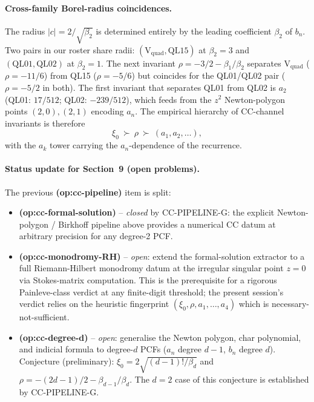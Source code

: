 \paragraph{Cross-family Borel-radius coincidences.}
The radius $|c|=2/\sqrt{\beta_2}$ is determined entirely by the leading
coefficient $\beta_2$ of $b_n$.  Two pairs in our roster share radii:
$(\mathrm{V}_{\text{quad}},\mathrm{QL15})$ at $\beta_2=3$ and
$(\mathrm{QL01},\mathrm{QL02})$ at $\beta_2=1$.
The next invariant $\rho=-3/2-\beta_1/\beta_2$ separates V$_{\text{quad}}$
($\rho=-11/6$) from QL15 ($\rho=-5/6$) but coincides for the QL01/QL02
pair ($\rho=-5/2$ in both).  The first invariant that separates QL01 from
QL02 is $a_2$ (QL01: $17/512$; QL02: $-239/512$), which feeds from the
$z^2$ Newton-polygon points $(2,0),(2,1)$ encoding $a_n$.  The empirical
hierarchy of CC-channel invariants is therefore
\[
\xi_0~\succ~\rho~\succ~(a_1,a_2,\dots),
\]
with the $a_k$ tower carrying the $a_n$-dependence of the recurrence.

\paragraph{Status update for Section~9 (open problems).}
The previous \textbf{(op:cc-pipeline)} item is split:
\begin{itemize}
\item \textbf{(op:cc-formal-solution)} -- \emph{closed} by CC-PIPELINE-G:
the explicit Newton-polygon / Birkhoff pipeline above provides a
numerical CC datum at arbitrary precision for any degree-2 PCF.
\item \textbf{(op:cc-monodromy-RH)} -- \emph{open}: extend the formal-solution
extractor to a full Riemann-Hilbert monodromy datum at the irregular
singular point $z=0$ via Stokes-matrix computation.  This is the
prerequisite for a rigorous Painleve-class verdict at any
finite-digit threshold; the present session's verdict relies on the
heuristic fingerprint $(\xi_0,\rho,a_1,\dots,a_4)$ which is
necessary-not-sufficient.
\item \textbf{(op:cc-degree-d)} -- \emph{open}: generalise the Newton
polygon, char polynomial, and indicial formula to degree-$d$ PCFs
($a_n$ degree $d-1$, $b_n$ degree $d$).  Conjecture (preliminary):
$\xi_0=2\sqrt{(d-1)!/\beta_d}$ and $\rho=-(2d-1)/2-\beta_{d-1}/\beta_d$.
The $d=2$ case of this conjecture is established by CC-PIPELINE-G.
\end{itemize}

